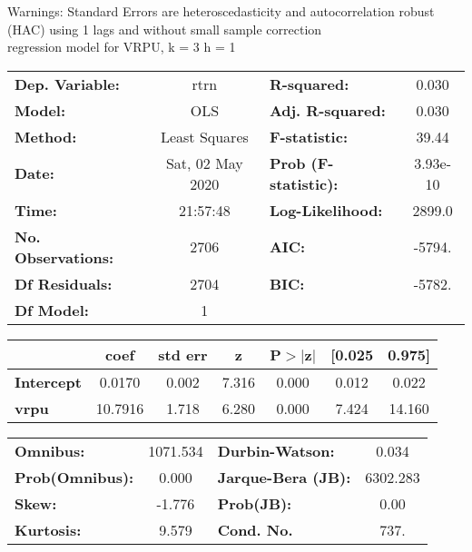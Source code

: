 Warnings: \newline
 [1] Standard Errors are heteroscedasticity and autocorrelation robust (HAC) using 1 lags and without small sample correction\\ 

regression model for VRPU, k = 3 h = 1\begin{center}
\begin{tabular}{lclc}
\toprule
\textbf{Dep. Variable:}    &       rtrn       & \textbf{  R-squared:         } &     0.030   \\
\textbf{Model:}            &       OLS        & \textbf{  Adj. R-squared:    } &     0.030   \\
\textbf{Method:}           &  Least Squares   & \textbf{  F-statistic:       } &     39.44   \\
\textbf{Date:}             & Sat, 02 May 2020 & \textbf{  Prob (F-statistic):} &  3.93e-10   \\
\textbf{Time:}             &     21:57:48     & \textbf{  Log-Likelihood:    } &    2899.0   \\
\textbf{No. Observations:} &        2706      & \textbf{  AIC:               } &    -5794.   \\
\textbf{Df Residuals:}     &        2704      & \textbf{  BIC:               } &    -5782.   \\
\textbf{Df Model:}         &           1      & \textbf{                     } &             \\
\bottomrule
\end{tabular}
\begin{tabular}{lcccccc}
                   & \textbf{coef} & \textbf{std err} & \textbf{z} & \textbf{P$> |$z$|$} & \textbf{[0.025} & \textbf{0.975]}  \\
\midrule
\textbf{Intercept} &       0.0170  &        0.002     &     7.316  &         0.000        &        0.012    &        0.022     \\
\textbf{vrpu}      &      10.7916  &        1.718     &     6.280  &         0.000        &        7.424    &       14.160     \\
\bottomrule
\end{tabular}
\begin{tabular}{lclc}
\textbf{Omnibus:}       & 1071.534 & \textbf{  Durbin-Watson:     } &    0.034  \\
\textbf{Prob(Omnibus):} &   0.000  & \textbf{  Jarque-Bera (JB):  } & 6302.283  \\
\textbf{Skew:}          &  -1.776  & \textbf{  Prob(JB):          } &     0.00  \\
\textbf{Kurtosis:}      &   9.579  & \textbf{  Cond. No.          } &     737.  \\
\bottomrule
\end{tabular}
\end{center}

